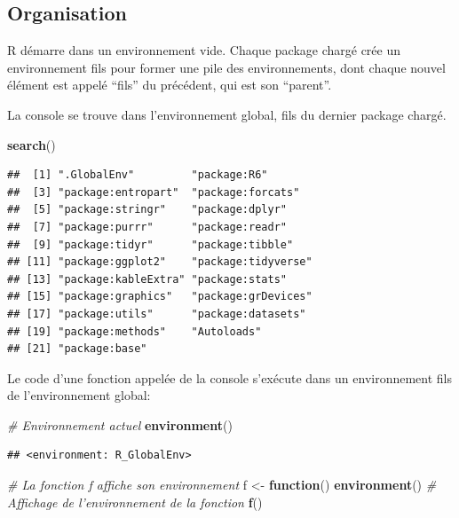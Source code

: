 \documentclass[
  12pt,
  french,
  a4paper,
  extrafontsizes,onecolumn,openright
  ]{memoir}
\newenvironment{Shaded}{\begin{snugshade}}{\end{snugshade}}
\newcommand{\CommentTok}[1]{\textcolor[rgb]{0.56,0.35,0.01}{\textit{#1}}}
\newcommand{\ControlFlowTok}[1]{\textcolor[rgb]{0.13,0.29,0.53}{\textbf{#1}}}
\newcommand{\KeywordTok}[1]{\textcolor[rgb]{0.13,0.29,0.53}{\textbf{#1}}}
\newcommand{\NormalTok}[1]{#1}
\newcommand{\StringTok}[1]{\textcolor[rgb]{0.31,0.60,0.02}{#1}}
\begin{document}
\hypertarget{organisation}{%
\subsection{Organisation}\label{organisation}}

R démarre dans un environnement vide.
Chaque package chargé crée un environnement fils pour former une pile des environnements, dont chaque nouvel élément est appelé \enquote{fils} du précédent, qui est son \enquote{parent}.

La console se trouve dans l'environnement global, fils du dernier package chargé.

\scriptsize

\begin{Shaded}
\begin{Highlighting}[]
\KeywordTok{search}\NormalTok{()}
\end{Highlighting}
\end{Shaded}

\begin{verbatim}
##  [1] ".GlobalEnv"         "package:R6"        
##  [3] "package:entropart"  "package:forcats"   
##  [5] "package:stringr"    "package:dplyr"     
##  [7] "package:purrr"      "package:readr"     
##  [9] "package:tidyr"      "package:tibble"    
## [11] "package:ggplot2"    "package:tidyverse" 
## [13] "package:kableExtra" "package:stats"     
## [15] "package:graphics"   "package:grDevices" 
## [17] "package:utils"      "package:datasets"  
## [19] "package:methods"    "Autoloads"         
## [21] "package:base"
\end{verbatim}

\normalsize

Le code d'une fonction appelée de la console s'exécute dans un environnement fils de l'environnement global:

\scriptsize

\begin{Shaded}
\begin{Highlighting}[]
\CommentTok{# Environnement actuel}
\KeywordTok{environment}\NormalTok{()}
\end{Highlighting}
\end{Shaded}

\begin{verbatim}
## <environment: R_GlobalEnv>
\end{verbatim}

\begin{Shaded}
\begin{Highlighting}[]
\CommentTok{# La fonction f affiche son environnement}
\NormalTok{f <-}\StringTok{ }\ControlFlowTok{function}\NormalTok{() }\KeywordTok{environment}\NormalTok{()}
\CommentTok{# Affichage de l'environnement de la fonction}
\KeywordTok{f}\NormalTok{()}
\end{Highlighting}
\end{Shaded}
\end{document}
